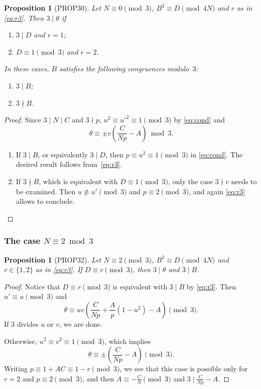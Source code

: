 \documentclass[12pt,twoside,leqno]{article}
\newtheorem{proposition}[theorem]{Proposition}
\numberwithin{equation}{section}
\newenvironment {alphenumerate}
   {\renewcommand {\labelenumi}{(\alph {enumi})}
    \renewcommand {\labelenumii}{(\alph {enumi}\arabic {enumii})}
    \begin {enumerate}}
   {\end {enumerate}}
\begin{document}
\begin{proposition}[PROP30]\label{prop:Neq0mod3}
Let $N \equiv 0 \pmod 3$, $B^2 \equiv D \pmod {4 N}$
and $r$ as in \eqref {eq:r3}.
Then $3 \mid \theta$ if
\begin {alphenumerate}
\item
$3 \mid D$ and $r = 1$;
\item
$D \equiv 1 \pmod 3$ and $r=2$.
\end {alphenumerate}
In these cases, $B$ satisfies the following congruences modulo~$3$:
\begin {alphenumerate}
\item
$3 \mid B$;
\item
$3 \nmid B$.
\end {alphenumerate}
\end{proposition}

\begin{proof}
Since $3 \mid N \mid C$ and $3 \nmid p$,
$u^2 \equiv {u'}^2\equiv 1\pmod 3$ by \eqref {eq:cond} and
\[
\theta \equiv \pm v \left(\frac{C}{Np} - A\right) \bmod 3.
\]

\begin {alphenumerate}
\item
If $3 \mid B$, or equivalently $3 \mid D$, then $p\equiv u^2 \equiv 1\pmod 3$
in \eqref{eq:cond}. The desired result follows from~\eqref {eq:r3}.
\item
If $3 \nmid B$, which is equivalent with $D \equiv 1 \pmod 3$,
only the case $3 \nmid v$ needs to be examined. Then
$u \not\equiv u' \pmod 3$
and $p \equiv 2 \pmod 3$, and again \eqref {eq:r3} allows to
conclude.
\end {alphenumerate}
\end{proof}

\subsubsection{The case \texorpdfstring {$N\equiv 2\bmod 3$}{N=2 mod 3}}

\begin{proposition}[PROP32]\label{prop:Neq2mod3}
Let $N \equiv 2 \pmod 3$, $B^2 \equiv D \pmod {4 N}$
and $r \in \{1, 2\}$ as in \eqref {eq:r3}.
If $D \equiv r \pmod 3$, then $3 \mid \theta$ and $3 \mid B$.
\end{proposition}

\begin{proof}
Notice that $D \equiv r \pmod 3$ is equivalent with
$3 \mid B$ by \eqref {eq:r3}.
Then $u'\equiv u\pmod 3$ and
$$\theta \equiv u v \left(\frac{C}{Np} + \frac{A}{p} (1-u^2)
- A\right) \pmod 3.$$
If $3$ divides $u$ or $v$, we are done.

Otherwise, $u^2 \equiv v^2 \equiv 1\pmod 3$,
which implies
$$\theta \equiv \pm \left(\frac{C}{Np} -A\right) \pmod 3.$$
Writing $p \equiv 1 + A C \equiv 1 - r \pmod 3$, we see that this case
is possible only for $r = 2$ and $p \equiv 2 \pmod 3$,
and then $A \equiv - \frac {C}{N} \pmod 3$ and $3 \mid \frac{C}{Np} - A$.
\end {proof}
\end{document}
